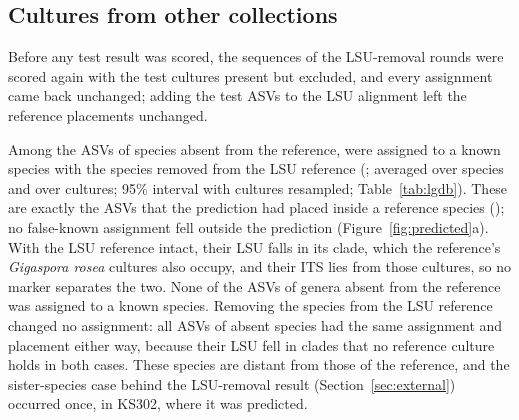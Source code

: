 \documentclass[11pt]{article}
\newcommand{\spn}[1]{\emph{#1}}   %
\begin{document}
\subsection{Cultures from other collections}\label{sec:lgdb}
Before any test result was scored, the \LgParityCopies{} sequences of the \LgParityFolds{} LSU-removal rounds were
scored again with the test cultures present but excluded, and every assignment came back unchanged; adding the test
ASVs to the LSU alignment left the \LgParityA{} reference placements unchanged.

Among the \LgNovelN{} ASVs of species absent from the reference, \LgFK{} were assigned to a known species with the
species removed from the LSU reference (\LgFKPct{}; \LgFKSpMacro{} averaged over species and \LgFKCuMacro{} over
cultures; 95\% interval \CiLgFKCu{} with cultures resampled; Table~\ref{tab:lgdb}). These are exactly the \LgLockedN{}
ASVs that the prediction had placed inside a reference species (\LgFKCase{}); no false-known assignment fell outside
the prediction (Figure~\ref{fig:predicted}a). With the LSU reference intact, their LSU falls in its \LgFKLSUCladeA{}
clade, which the reference's \spn{Gigaspora rosea} cultures also occupy, and their ITS lies \LgFKITSRange{} from
those cultures, so no marker separates the two. None of the \LgNovelLinN{} ASVs of genera absent from the reference
was assigned to a known species. Removing the species from the LSU reference changed no assignment: all \LgABSame{}
ASVs of absent species had the same assignment and placement either way, because their LSU fell in clades that no
reference culture holds in both cases. These species are distant from those of the reference, and the
sister-species case behind the LSU-removal result (Section~\ref{sec:external}) occurred once, in KS302, where it was
predicted.
\end{document}
